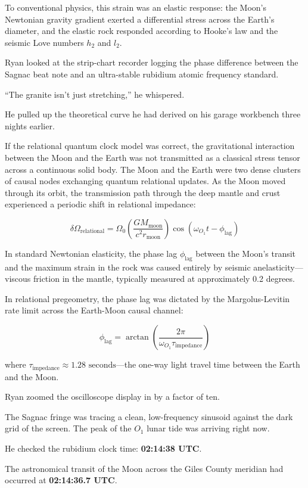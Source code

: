 \documentclass[12pt,twoside,openright]{book}
\begin{document}
To conventional physics, this strain was an elastic response: the Moon's
Newtonian gravity gradient exerted a differential stress across the
Earth's diameter, and the elastic rock responded according to Hooke's
law and the seismic Love numbers \(h_2\) and \(l_2\).

Ryan looked at the strip-chart recorder logging the phase difference
between the Sagnac beat note and an ultra-stable rubidium atomic
frequency standard.

``The granite isn't just stretching,'' he whispered.

He pulled up the theoretical curve he had derived on his garage
workbench three nights earlier.

If the relational quantum clock model was correct, the gravitational
interaction between the Moon and the Earth was not transmitted as a
classical stress tensor across a continuous solid body. The Moon and the
Earth were two dense clusters of causal nodes exchanging quantum
relational updates. As the Moon moved through its orbit, the
transmission path through the deep mantle and crust experienced a
periodic shift in relational impedance:

\[\delta \Omega_{\text{relational}} = \Omega_0 \left( \frac{GM_{\text{moon}}}{c^2 r_{\text{moon}}} \right) \cos(\omega_{O_1} t - \phi_{\text{lag}})\]

In standard Newtonian elasticity, the phase lag \(\phi_{\text{lag}}\)
between the Moon's transit and the maximum strain in the rock was caused
entirely by seismic anelasticity---viscous friction in the mantle,
typically measured at approximately 0.2 degrees.

In relational pregeometry, the phase lag was dictated by the
Margolus-Levitin rate limit across the Earth-Moon causal channel:

\[\phi_{\text{lag}} = \arctan\left( \frac{2 \pi}{\omega_{O_1} \tau_{\text{impedance}}} \right)\]

where \(\tau_{\text{impedance}} \approx 1.28 \text{ seconds}\)---the
one-way light travel time between the Earth and the Moon.

Ryan zoomed the oscilloscope display in by a factor of ten.

The Sagnac fringe was tracing a clean, low-frequency sinusoid against
the dark grid of the screen. The peak of the \(O_1\) lunar tide was
arriving right now.

He checked the rubidium clock time: \textbf{02:14:38 UTC}.

The astronomical transit of the Moon across the Giles County meridian
had occurred at \textbf{02:14:36.7 UTC}.
\end{document}
